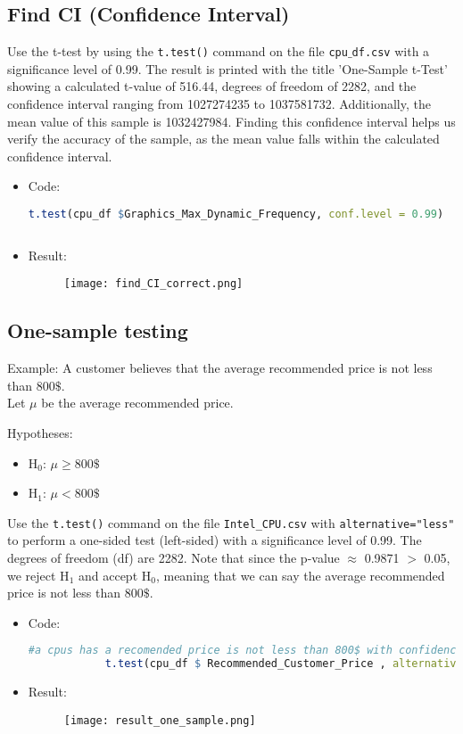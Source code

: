 \documentclass{article}
\begin{document}
	\subsection{Find CI (Confidence Interval)}
	Use the t-test by using the \texttt{t.test()} command on the file \texttt{cpu$\_$df.csv} with a significance level of 0.99. The result is printed with the title 'One-Sample t-Test' showing a calculated t-value of 516.44, degrees of freedom of 2282, and the confidence interval ranging from 1027274235 to 1037581732. Additionally, the mean value of this sample is 1032427984. Finding this confidence interval helps us verify the accuracy of the sample, as the mean value falls within the calculated confidence interval.
	\begin{itemize}
		\item
		Code:
		\begin{lstlisting}[language=R]
			t.test(cpu_df $Graphics_Max_Dynamic_Frequency, conf.level = 0.99)
			
		\end{lstlisting}
		\item Result:
		\begin{figure}[h]
			\centering
			\texttt{[image: find\_CI\_correct.png]}
		\end{figure}
	\end{itemize}
	
	
	\subsection{One-sample testing}
	Example: A customer believes that the average recommended price is not less than 800$\$$.\\
	Let $\mu$ be the average recommended price.
	
	Hypotheses:
	\begin{itemize}
		\item H$_0$: $\mu \geq 800\$$
		\item H$_1$: $\mu < 800\$$
	\end{itemize}
	
	Use the \texttt{t.test()} command on the file \texttt{Intel\_CPU.csv} with \texttt{alternative="less"} to perform a one-sided test (left-sided) with a significance level of 0.99. The degrees of freedom (df) are 2282. Note that since the p-value $\approx$ 0.9871 $>$ 0.05, we reject H$_1$ and accept H$_0$, meaning that we can say the average recommended price is not less than 800$\$$.
	
	\begin{itemize}
		\item
		Code:
		\begin{lstlisting}[language=R]
			#a cpus has a recomended price is not less than 800$ with confidence level = 99%
			t.test(cpu_df $ Recommended_Customer_Price , alternative =  "less" , mu = 800, conf.level = 0.99)
		\end{lstlisting}
		\item Result:
		
		\begin{figure}[h]
			\centering
			\texttt{[image: result\_one\_sample.png]}
			\label{fig:enter-label}
		\end{figure}
	\end{itemize}
\end{document}
